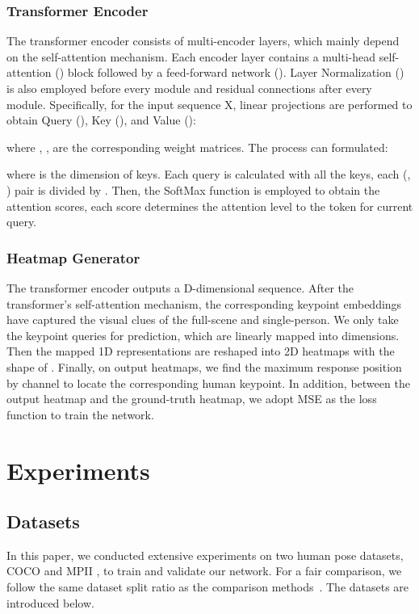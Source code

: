 \documentclass[runningheads]{llncs}
\begin{document}
\subsubsection{Transformer Encoder}
The transformer encoder consists of multi-encoder layers, which mainly depend on the self-attention mechanism. Each encoder layer contains a multi-head self-attention () block followed by a feed-forward network (). Layer Normalization () is also employed before every module and residual connections after every module. Specifically, for the input sequence X, linear projections are performed to obtain Query (), Key (), and Value ():

where , ,  are the corresponding weight matrices. The  process can formulated:

where  is the dimension of keys. Each query is calculated with all the keys, each (, ) pair is divided by . Then, the SoftMax function is employed to obtain the attention scores, each score determines the attention level to the token for current query. 


\subsubsection{Heatmap Generator}
The transformer encoder outputs a D-dimensional sequence. After the transformer's self-attention mechanism, the corresponding keypoint embeddings have captured the visual clues of the full-scene and single-person. We only take the keypoint queries for prediction, which are linearly mapped into  dimensions. Then the mapped 1D representations are reshaped into 2D heatmaps with the shape of . Finally, on output heatmaps, we find the maximum response position by channel to locate the corresponding human keypoint. In addition, between the output heatmap and the ground-truth heatmap, we adopt MSE as the loss function to train the network. 
\section{Experiments} \label{sec:Experiments}
\subsection{Datasets}
In this paper, we conducted extensive experiments on two human pose datasets, COCO \cite{COCO2014microsoft} and MPII \cite{MPII20142d}, to train and validate our network. For a fair comparison, we follow the same dataset split ratio as the comparison methods~\cite{HRNet2019}. The datasets are introduced below.
\end{document}
